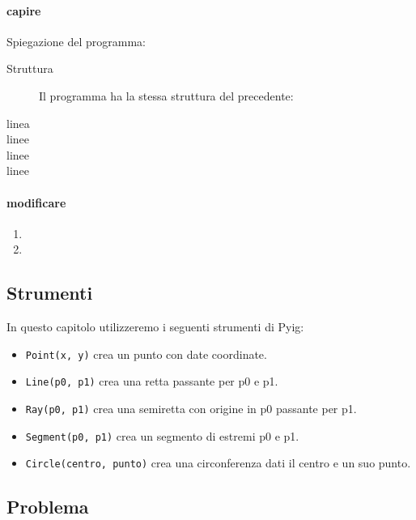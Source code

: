 \paragraph{capire}
Spiegazione del programma:

\begin{description}
 \item [Struttura] 
 Il programma ha la stessa struttura del precedente:
 \item [linea ]
 
 \item [linee ]
 
 \item [linee ]
 \item [linee ]
\end{description}

\begin{osservazione}

\end{osservazione}

\paragraph{modificare}
\begin{enumerate} [noitemsep]
 \item 
 \item 
\end{enumerate}

\subsection{Strumenti}

In questo capitolo utilizzeremo i seguenti strumenti di Pyig:
\begin{itemize} [noitemsep]
\item \texttt{Point(x, y)} crea un punto con date coordinate.
\item \texttt{Line(p0, p1)} crea una retta passante per p0 e p1.
\item \texttt{Ray(p0, p1)} crea una semiretta con origine in p0 passante per p1.
\item \texttt{Segment(p0, p1)} crea un segmento di estremi p0 e p1.
\item \texttt{Circle(centro, punto)} crea una circonferenza dati il centro e 
un suo punto.

\end{itemize}


\subsection{Problema}

